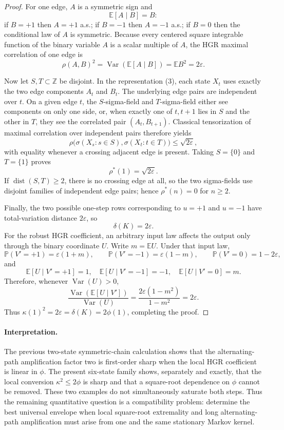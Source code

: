 \begin{proof}
For one edge, $A$ is a symmetric sign and
\[
 \mathbb E[A\mid B]=B:
\]
if $B=+1$ then $A=+1$ a.s.; if $B=-1$ then $A=-1$ a.s.; if $B=0$ then the
conditional law of $A$ is symmetric.  Because every centered square
integrable function of the binary variable $A$ is a scalar multiple of
$A$, the HGR maximal correlation of one edge is
\[
 \rho(A,B)^2
 =\operatorname{Var}(\mathbb E[A\mid B])
 =\mathbb E B^2
 =2\varepsilon.
 \tag{4}
\]

Now let $S,T\subset\mathbb Z$ be disjoint.  In the representation (3), each
state $X_t$ uses exactly the two edge components $A_t$ and $B_t$.  The
underlying edge pairs are independent over $t$.  On a given edge $t$, the
$S$-sigma-field and $T$-sigma-field either see components on only one side,
or, when exactly one of $t,t+1$ lies in $S$ and the other in $T$, they see
the correlated pair $(A_t,B_{t+1})$.  Classical tensorization of maximal
correlation over independent pairs therefore yields
\[
 \rho\bigl(\sigma(X_s:s\in S),\sigma(X_t:t\in T)\bigr)
 \le \sqrt{2\varepsilon},
\]
with equality whenever a crossing adjacent edge is present.  Taking
$S=\{0\}$ and $T=\{1\}$ proves
\[
 \rho^*(1)=\sqrt{2\varepsilon}.
\]
If $\operatorname{dist}(S,T)\ge2$, there is no crossing edge at all, so the
two sigma-fields use disjoint families of independent edge pairs; hence
$\rho^*(n)=0$ for $n\ge2$.

Finally, the two possible one-step rows corresponding to $u=+1$ and $u=-1$
have total-variation distance $2\varepsilon$, so
\[
 \delta(K)=2\varepsilon.
\]
For the robust HGR coefficient, an arbitrary input law affects the output
only through the binary coordinate $U$.  Write $m=\mathbb E U$.  Under that
input law,
\[
 \mathbb P(V'=+1)=\varepsilon(1+m),\qquad
 \mathbb P(V'=-1)=\varepsilon(1-m),\qquad
 \mathbb P(V'=0)=1-2\varepsilon,
\]
and
\[
 \mathbb E[U\mid V'=+1]=1,\quad
 \mathbb E[U\mid V'=-1]=-1,\quad
 \mathbb E[U\mid V'=0]=m.
\]
Therefore, whenever $\operatorname{Var}(U)>0$,
\[
 \frac{\operatorname{Var}(\mathbb E[U\mid V'])}{\operatorname{Var}(U)}
 =\frac{2\varepsilon(1-m^2)}{1-m^2}
 =2\varepsilon.
\]
Thus $\kappa(1)^2=2\varepsilon=\delta(K)=2\phi(1)$, completing the proof.
\end{proof}

\paragraph{Interpretation.}
The previous two-state symmetric-chain calculation shows that the
alternating-path amplification factor two is first-order sharp when the
local HGR coefficient is linear in $\phi$.  The present six-state family
shows, separately and exactly, that the local conversion
$\kappa^2\le2\phi$ is sharp and that a square-root dependence on $\phi$
cannot be removed.  These two examples do not simultaneously saturate both
steps.  Thus the remaining quantitative question is a compatibility
problem: determine the best universal envelope when local square-root
extremality and long alternating-path amplification must arise from one and
the same stationary Markov kernel.